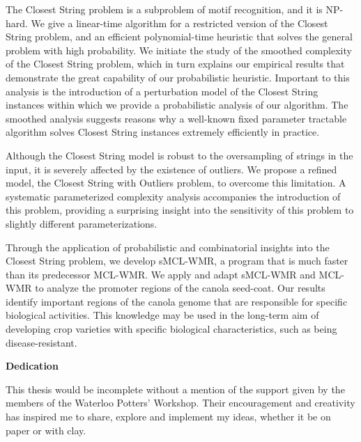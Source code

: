 The {\sc Closest String} problem is a subproblem of motif recognition, and it is NP-hard.  We give a linear-time algorithm for a restricted version of the {\sc Closest String} problem, and an efficient polynomial-time heuristic that solves the general problem with high probability. We initiate the study of the smoothed complexity of the {\sc Closest String} problem, which in turn explains our empirical results that demonstrate the great capability of our probabilistic heuristic. Important to this analysis is the introduction of a perturbation model of the {\sc Closest String} instances within which we provide a probabilistic analysis of our algorithm.  The smoothed analysis suggests reasons why a well-known fixed parameter tractable algorithm solves {\sc Closest String} instances extremely efficiently in practice.  

Although the {\sc Closest String} model is robust to the oversampling of strings in the input, it is severely affected by the existence of outliers. We propose a refined model, the {\sc Closest String with Outliers} problem, to overcome this limitation.  A systematic parameterized complexity analysis accompanies the introduction of this problem, providing a surprising insight into the sensitivity of this problem to slightly different parameterizations. 

Through the application of probabilistic and combinatorial insights into the {\sc Closest String} problem, we develop sMCL-WMR, a program that is much faster than its predecessor MCL-WMR.  We apply and adapt sMCL-WMR and MCL-WMR to analyze the promoter regions of the canola seed-coat.  Our results identify important regions of the canola genome that are responsible for specific biological activities.  This knowledge may be used in the long-term aim of developing crop varieties with specific biological characteristics, such as being disease-resistant.

\cleardoublepage

    
     

\begin{center}\textbf{Dedication}\end{center}
This thesis would be incomplete without a mention of the support given by the members of the Waterloo Potters' Workshop.  Their encouragement and creativity has inspired me to share, explore and implement my ideas, whether it be on paper or with clay.   
\cleardoublepage

